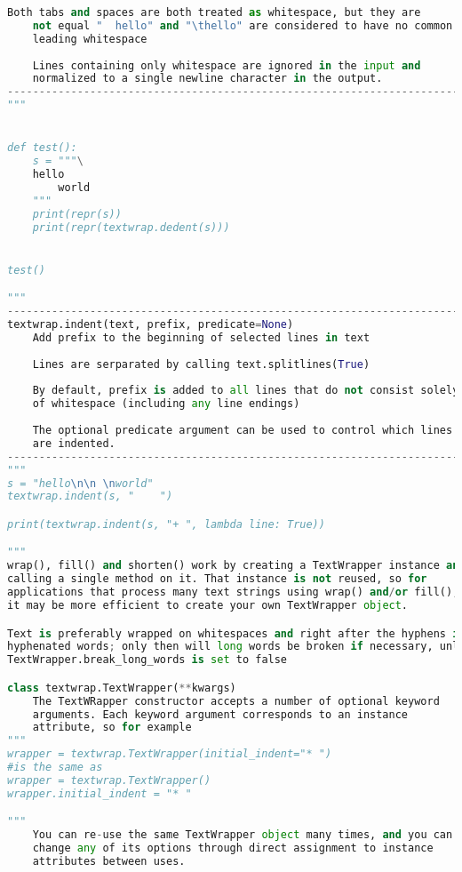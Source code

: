\documentclass[a4paper,landscape]{report}
\begin{document}
\begin{lstlisting}[language=Python]
    Both tabs and spaces are both treated as whitespace, but they are
    not equal "  hello" and "\thello" are considered to have no common
    leading whitespace
    
    Lines containing only whitespace are ignored in the input and 
    normalized to a single newline character in the output.
------------------------------------------------------------------------
"""


def test():
    s = """\
    hello
        world
    """
    print(repr(s))
    print(repr(textwrap.dedent(s)))


test()

"""
------------------------------------------------------------------------
textwrap.indent(text, prefix, predicate=None)
    Add prefix to the beginning of selected lines in text
    
    Lines are serparated by calling text.splitlines(True)
    
    By default, prefix is added to all lines that do not consist solely
    of whitespace (including any line endings)
    
    The optional predicate argument can be used to control which lines
    are indented.
------------------------------------------------------------------------
"""
s = "hello\n\n \nworld"
textwrap.indent(s, "    ")

print(textwrap.indent(s, "+ ", lambda line: True))

"""
wrap(), fill() and shorten() work by creating a TextWrapper instance and
calling a single method on it. That instance is not reused, so for
applications that process many text strings using wrap() and/or fill(),
it may be more efficient to create your own TextWrapper object.

Text is preferably wrapped on whitespaces and right after the hyphens in
hyphenated words; only then will long words be broken if necessary, unless
TextWrapper.break_long_words is set to false

class textwrap.TextWrapper(**kwargs)
    The TextWRapper constructor accepts a number of optional keyword
    arguments. Each keyword argument corresponds to an instance
    attribute, so for example
"""
wrapper = textwrap.TextWrapper(initial_indent="* ")
#is the same as
wrapper = textwrap.TextWrapper()
wrapper.initial_indent = "* "

"""
    You can re-use the same TextWrapper object many times, and you can
    change any of its options through direct assignment to instance
    attributes between uses.
    

\end{lstlisting}
\end{document}
